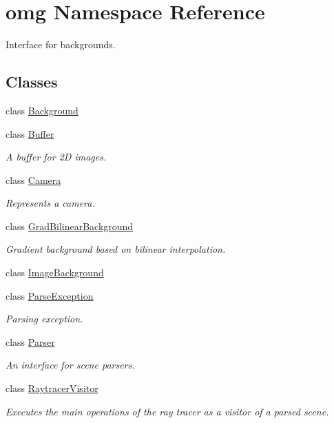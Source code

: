 \hypertarget{namespaceomg}{}\section{omg Namespace Reference}
\label{namespaceomg}


Interface for backgrounds.  


\subsection*{Classes}
\begin{DoxyCompactItemize}
\item 
class \mbox{\hyperlink{classomg_1_1_background}{Background}}
\item 
class \mbox{\hyperlink{classomg_1_1_buffer}{Buffer}}
\begin{DoxyCompactList}\small\item\em A buffer for 2D images. \end{DoxyCompactList}\item 
class \mbox{\hyperlink{classomg_1_1_camera}{Camera}}
\begin{DoxyCompactList}\small\item\em Represents a camera. \end{DoxyCompactList}\item 
class \mbox{\hyperlink{classomg_1_1_grad_bilinear_background}{Grad\+Bilinear\+Background}}
\begin{DoxyCompactList}\small\item\em Gradient background based on bilinear interpolation. \end{DoxyCompactList}\item 
class \mbox{\hyperlink{classomg_1_1_image_background}{Image\+Background}}
\item 
class \mbox{\hyperlink{classomg_1_1_parse_exception}{Parse\+Exception}}
\begin{DoxyCompactList}\small\item\em Parsing exception. \end{DoxyCompactList}\item 
class \mbox{\hyperlink{classomg_1_1_parser}{Parser}}
\begin{DoxyCompactList}\small\item\em An interface for scene parsers. \end{DoxyCompactList}\item 
class \mbox{\hyperlink{classomg_1_1_raytracer_visitor}{Raytracer\+Visitor}}
\begin{DoxyCompactList}\small\item\em Executes the main operations of the ray tracer as a visitor of a parsed scene. \end{DoxyCompactList}\item 

\end{DoxyCompactItemize}
